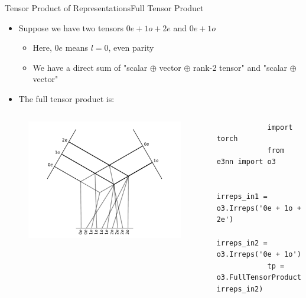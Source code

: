 \documentclass[pdf,serif]{beamer}
\begin{document}
\begin{frame}[fragile]{Tensor Product of Representations}{Full Tensor Product}
    \begin{itemize}
        \item Suppose we have two tensors $0e+1o+2e$ and $0e+1o$
        \begin{itemize}
            \item Here, $0e$ means $l=0$, even parity
            \item We have a direct sum of "scalar $\oplus$ vector $\oplus$ rank-2 tensor" and "scalar $\oplus$ vector"
        \end{itemize}
        \item The full tensor product is:
    \end{itemize}
    \begin{columns}
        \begin{figure}
            \includegraphics[width=\linewidth]{images/fulltp1.pdf}
        \end{figure}
        \begin{verbatim}
            import torch
            from e3nn import o3
    
            irreps_in1 = o3.Irreps('0e + 1o + 2e') 
            irreps_in2 = o3.Irreps('0e + 1o')
            tp = o3.FullTensorProduct(irreps_in1, irreps_in2)
        \end{verbatim}
    \end{columns}
\end{frame}
\end{document}
